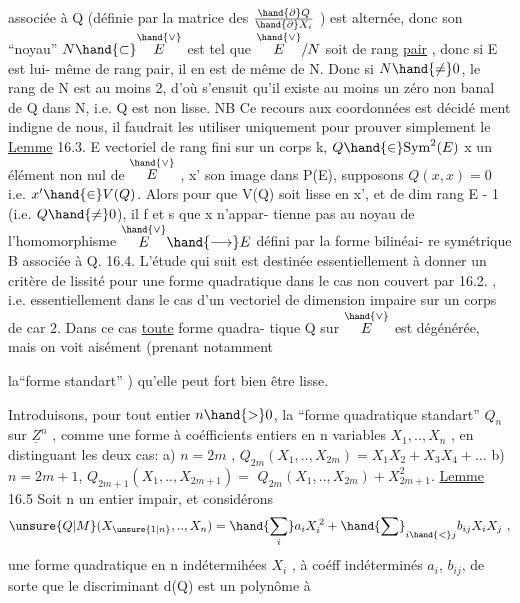 
associée à Q (définie par la matrice des $\frac{\hand{\partial} Q}{\hand{\partial} X_i}$ ) est alternée, donc son
``noyau''  $N\hand{\subset}\overset{\hand{\vee}}{E}$  est tel que  $\overset{\hand{\vee}}{E}/N$  soit de rang \uline{pair} , donc si E est lui-%
même de rang pair, il en est de même de N. Donc si $N\hand{\neq} 0$, le rang de N
est au moins 2, d'où s'ensuit qu'il existe au moins un zéro non banal de
Q dans N, i.e. Q est non lisse.  NB Ce recours aux coordonnées est décidé
ment indigne de nous, il faudrait les utiliser uniquement pour prouver
simplement le
\uline{Lemme} 16.3. E vectoriel de rang fini sur un corps k, $Q\hand{\in} \mathrm{Sym}^2(E)$ x un élément non nul de
$\overset{\hand{\vee}}{E}$ ,  x' son image dans P(E), supposons  $Q(x,x) = 0$ i.e.
$x'\hand{\in} V(Q)$. Alors pour que  V(Q) soit lisse en x',
et de dim  rang E - 1   (i.e. $Q\hand{\neq} 0$), il f et s  que x n'appar-%
tienne pas au noyau de l'homomorphisme $\overset{\hand{\vee}}{E}\hand{\longrightarrow} E$ défini par la forme bilinéai-%
re symétrique B associée à Q\hand{/}.
16.4.  L'étude qui suit est destinée essentiellement à 
donner un critère de lissité pour une forme quadratique dans le cas non
couvert par 16.2. , i.e. essentiellement dans le cas d'un vectoriel de
dimension impaire sur un corps de car 2. Dans ce cas \uline{toute} forme quadra-%
tique  Q  sur $\overset{\hand{\vee}}{E}$ est dégénérée, mais on voit aisément (prenant notamment

la``forme standart'' ) qu'elle peut fort bien être lisse.

Introduisons, pour tout entier  $n\hand{>}0$, la ``forme quadratique standart''
$Q_n$ sur $\underline{Z}^n$ , comme une forme à coéfficients entiers en n variables
$X_1,..,X_n$ ,  en distinguant les deux cas:
a)  $n = 2m$  ,  $Q_{2m}(X_1,..,X_{2m}) = X_1X_2 + X_3X_4 + \ldots$
b)  $n = 2m+1$,  $Q_{2m+1}(X_1,..,X_{2m+1}) =$ $Q_{2m}(X_1,..,X_{2m}) + X_{2m+1}^2$.
\uline{Lemme} 16.5  Soit n un entier impair, et considérons
\[ \unsure{Q|M}(X_{\unsure{1|n}},..,X_n) = \hand{\sum_i} a_iX_i^{\,2} + \hand{\sum}_{i\hand{<}j} b_{ij}X_iX_j \ , \]
une forme quadratique en n indétermihées $X_i$ , à coéff indéterminés
$a_i$, $b_{ij}$, de sorte que le discriminant  d(Q)  est un polynôme à

